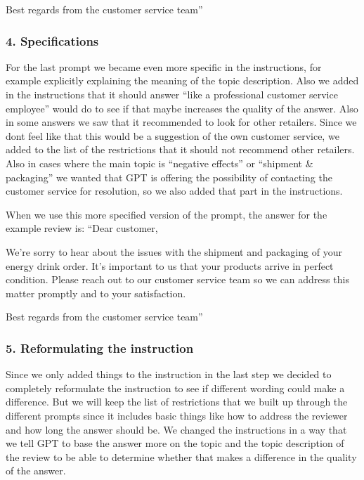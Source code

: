 \documentclass[
]{article}
\begin{document}
Best regards from the customer service team''

\hypertarget{specifications}{%
\subsubsection{4. Specifications}\label{specifications}}

For the last prompt we became even more specific in the instructions,
for example explicitly explaining the meaning of the topic description.
Also we added in the instructions that it should answer ``like a
professional customer service employee'' would do to see if that maybe
increases the quality of the answer. Also in some answers we saw that it
recommended to look for other retailers. Since we dont feel like that
this would be a suggestion of the own customer service, we added to the
list of the restrictions that it should not recommend other retailers.
Also in cases where the main topic is ``negative effects'' or ``shipment
\& packaging'' we wanted that GPT is offering the possibility of
contacting the customer service for resolution, so we also added that
part in the instructions.

When we use this more specified version of the prompt, the answer for
the example review is: ``Dear customer,

We're sorry to hear about the issues with the shipment and packaging of
your energy drink order. It's important to us that your products arrive
in perfect condition. Please reach out to our customer service team so
we can address this matter promptly and to your satisfaction.

Best regards from the customer service team''

\hypertarget{reformulating-the-instruction}{%
\subsubsection{5. Reformulating the
instruction}\label{reformulating-the-instruction}}

Since we only added things to the instruction in the last step we
decided to completely reformulate the instruction to see if different
wording could make a difference. But we will keep the list of
restrictions that we built up through the different prompts since it
includes basic things like how to address the reviewer and how long the
answer should be. We changed the instructions in a way that we tell GPT
to base the answer more on the topic and the topic description of the
review to be able to determine whether that makes a difference in the
quality of the answer.
\end{document}
